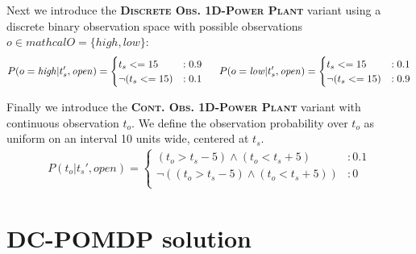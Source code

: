 \documentclass{article} %
\newcommand{\open}{\mathit{open}}
\newcommand{\close}{\mathit{close}}
\newcommand{\high}{\mathit{high}}
\newcommand{\low}{\mathit{low}}
\begin{document}
Next we introduce the \textsc{\bf Discrete Obs. 1D-Power Plant} variant using 
a discrete binary observation space with possible
observations $o \in mathcal{O} = \{\high,\low\}$:
{\footnotesize
\vspace{-1mm}
\begin{align}
P(o=\high|t_s',\open) = 
\begin{cases}
  t_s <= 15 &: 0.9 \\
 \neg (t_s <= 15)&: 0.1 \\
\end{cases}
\hspace{5mm}
P(o=\low|t_s',\open) = 
\begin{cases}
 t_s <= 15 &: 0.1 \\
 \neg (t_s <= 15) &: 0.9 \\
\end{cases}
\end{align}
\vspace{-3mm}
}

Finally we introduce the \textsc{\bf Cont. Obs. 1D-Power Plant}
variant with continuous observation $t_o$.  
We define the observation probability over $t_o$ as uniform on
an interval 10 units wide, centered at $t_s$.
{\footnotesize
\begin{align}
P(t_o|t_s',\open) = 
\begin{cases}
 (t_o>t_s-5) \wedge (t_o<t_s+5) &: 0.1 \\
 \neg((t_o>t_s-5) \wedge (t_o<t_s+5)) &: 0 \\
\end{cases}
\end{align}
}

\section{DC-POMDP solution}
\end{document}
